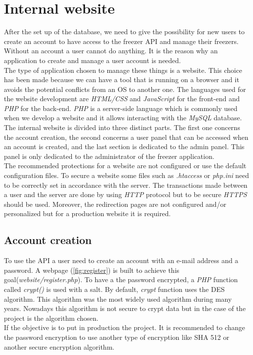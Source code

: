 \section{Internal website}
After the set up of the database, we need to give the possibility for new users to create an account to have access to the freezer API and manage their freezers. Without an account a user cannot do anything. It is the reason why an application to create and manage a user account is needed.\\

The type of application chosen to manage these things is a website. This choice has been made because we can have a tool that is running on a browser and it avoids the potential conflicts from an OS to another one. The languages used for the website development are \textit{HTML/CSS} and \textit{JavaScript} for the front-end and \textit{PHP} for the back-end. \textit{PHP} is a server-side language which is commonly used when we develop a website and it allows interacting with the \textit{MySQL} database. \\

The internal website is divided into three distinct parts. The first one concerns the account creation, the second concerns a user panel that can be accessed when an account is created, and the last section is dedicated to the admin panel. This panel is only dedicated to the administrator of the freezer application. \\

The recommended protections for a website are not configured or use the default configuration files. To secure a website some files such as \textit{.htaccess} or \textit{php.ini} need to be correctly set in accordance with the server. The transactions made between a user and the server are done by using \textit{HTTP} protocol but to be secure \textit{HTTPS} should be used. Moreover, the redirection pages are not configured and/or personalized but for a production website it is required.

\subsection{Account creation}
To use the API a user need to create an account with an e-mail address and a password. A webpage (\autoref{fig:register}) is built to achieve this goal(\textit{website/register.php}). To have a the password encrypted, a \textit{PHP} function called \textit{crypt()} is used with a salt. By default, \textit{crypt} function uses the DES algorithm. This algorithm was the most widely used algorithm during many years. Nowadays this algorithm is not secure to crypt data but in the case of the project is the algorithm chosen.\\
If the objective is to put in production the project. It is recommended to change the password encryption to use another type of encryption like SHA 512 or another secure encryption algorithm.\\

